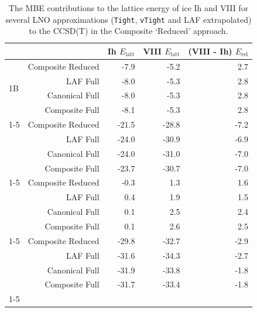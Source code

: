 \begin{table}[h]

\caption{\label{tab:ice_rel_ene_mbe_conv}The MBE contributions to the lattice energy of ice Ih and VIII for several LNO approximations ({\tt Tight}, {\tt vTight} and LAF extrapolated) to the CCSD(T) in the Composite `Reduced' approach.}
\begin{tabular}{lrrrr}
\toprule
 &  & Ih $E_\text{latt}$ & VIII $E_\text{latt}$ & (VIII - Ih) $E_\text{rel}$ \\ 
\midrule
\multirow[c]{4}{*}{1B} & Composite Reduced & -7.9 & -5.2 & 2.7 \\
 & LAF Full & -8.0 & -5.3 & 2.8 \\
 & Canonical Full & -8.0 & -5.3 & 2.8 \\
 & Composite Full & -8.1 & -5.3 & 2.8 \\
\cline{1-5}
\multirow[c]{4}{*}{2B} & Composite Reduced & -21.5 & -28.8 & -7.2 \\
 & LAF Full & -24.0 & -30.9 & -6.9 \\
 & Canonical Full & -24.0 & -31.0 & -7.0 \\
 & Composite Full & -23.7 & -30.7 & -7.0 \\
\cline{1-5}
\multirow[c]{4}{*}{3B} & Composite Reduced & -0.3 & 1.3 & 1.6 \\
 & LAF Full & 0.4 & 1.9 & 1.5 \\
 & Canonical Full & 0.1 & 2.5 & 2.4 \\
 & Composite Full & 0.1 & 2.6 & 2.5 \\
\cline{1-5}
\multirow[c]{4}{*}{Total} & Composite Reduced & -29.8 & -32.7 & -2.9 \\
 & LAF Full & -31.6 & -34.3 & -2.7 \\
 & Canonical Full & -31.9 & -33.8 & -1.8 \\
 & Composite Full & -31.7 & -33.4 & -1.8 \\
\cline{1-5}
\bottomrule
\end{tabular}

\end{table}